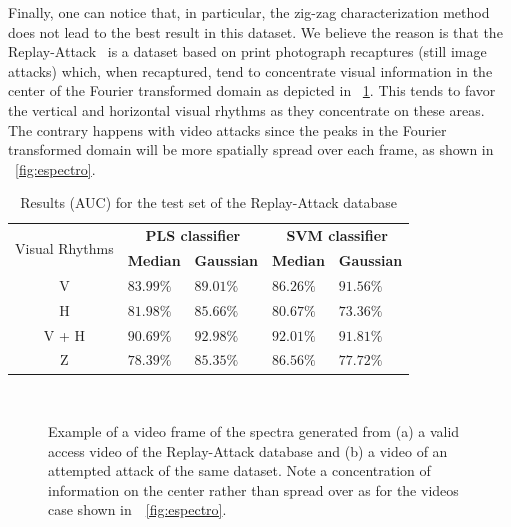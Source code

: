 \documentclass[journal]{IEEEtran}
\providecommand{\rrv}[1]{{\protect\color{black}{#1}}}
\providecommand{\bmark}[1]{{\protect\color{black}{#1}}}
\newcommand {\otoprule}{\midrule[\heavyrulewidth]}
\begin{document}
Finally, one can notice that, in particular, the zig-zag characterization method does not lead to the best result in this dataset. We believe the reason is that the Replay-Attack~\cite{Chingovska:BIOSEG:2012} is a dataset based on print photograph recaptures (still image attacks) which, when recaptured, tend to concentrate visual information in the center of the Fourier transformed domain as depicted in \rrv{Fig.}~\ref{fig:spectrum_datasets:replay}. This tends to favor the vertical and horizontal visual rhythms as they concentrate on these areas. The contrary happens with video attacks since the peaks in the Fourier transformed domain will be more spatially spread over each frame, as shown in \rrv{Fig.}~\ref{fig:espectro}. \bmark{Result obtained by the TukeyHSD' test confirm that difference between V+H and Z visual rhythms are statistically significant (p-value=$0.03$).}
%
\begin{table}[!htb]
\caption{Results (AUC) for the test set of the Replay-Attack database}
\label{table:replayEval}
\centering
\begin{tabular}{cllll}
\toprule
\multirow{2}{*}{Visual Rhythms} & \multicolumn{2}{c}{\centering \textbf{PLS classifier}} & \multicolumn{2}{c}{\centering \textbf{SVM classifier}}\\
\cline{2-5}
     & \textbf{Median} & \textbf{Gaussian} & \textbf{Median} & \textbf{Gaussian}\\
\otoprule
V & $83.99\%$ & $89.01\%$ & $86.26\%$ & $91.56\%$ \\ 
\hline
H & $81.98\%$ & $85.66\%$ & $80.67\%$ & $73.36\%$ \\ 
\hline
V + H & $90.69\%$ & $92.98\%$ & $92.01\%$ & $91.81\%$ \\ 
\hline
Z & $78.39\%$ & $85.35\%$ & $86.56\%$ & $77.72\%$ \\ 
\bottomrule
\end{tabular}
\end{table}
%
\begin{figure}[htb]
\centering
{} 
 \\
\caption{{Example of a video frame of the spectra generated from (a) a valid access video of the Replay-Attack database and (b) a video of an attempted attack of the same dataset. Note a concentration of information on the center rather than spread over as for the videos case shown in~\rrv{Fig.}~\ref{fig:espectro}.}}
\label{fig:spectrum_datasets:replay}
\end{figure}
\end{document}
